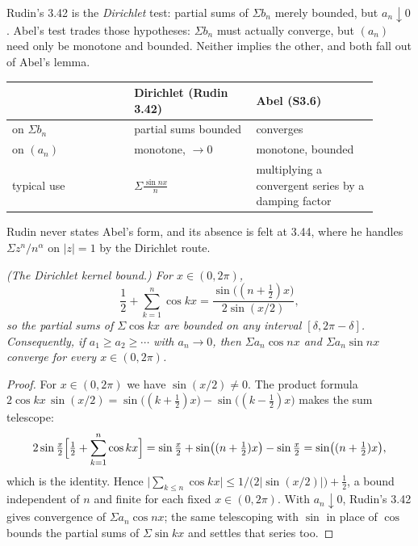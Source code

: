\begin{deeper}
Rudin's 3.42 is the \emph{Dirichlet} test: partial sums of $\Sigma b_n$
merely bounded, but $a_n \downarrow 0$. Abel's test trades those hypotheses:
$\Sigma b_n$ must actually converge, but $(a_n)$ need only be monotone and
bounded. Neither implies the other, and both fall out of Abel's lemma.

\smallskip
\begin{tabular}{@{}p{0.3\linewidth}p{0.3\linewidth}p{0.3\linewidth}@{}}
\toprule
& \textbf{Dirichlet (Rudin 3.42)} & \textbf{Abel (S3.6)} \\
\midrule
on $\Sigma b_n$   & partial sums bounded & converges \\
on $(a_n)$        & monotone, $\to 0$    & monotone, bounded \\
typical use       & $\Sigma \frac{\sin nx}{n}$ & multiplying a convergent
series by a damping factor \\
\bottomrule
\end{tabular}

\smallskip
Rudin never states Abel's form, and its absence is felt at 3.44, where he
handles $\Sigma z^n/n^{\alpha}$ on $|z|=1$ by the Dirichlet route.
\end{deeper}

\emph{(The Dirichlet kernel bound.) For $x \in (0,2\pi)$,}
\[ \frac12 + \sum_{k=1}^{n}\cos kx
   = \frac{\sin\bigl((n+\tfrac12)x\bigr)}{2\sin(x/2)} , \]
\emph{so the partial sums of $\Sigma\cos kx$ are bounded on any interval
$[\delta, 2\pi-\delta]$. Consequently, if $a_1 \ge a_2 \ge \cdots$ with
$a_n \to 0$, then $\Sigma a_n \cos nx$ and $\Sigma a_n \sin nx$ converge for
every $x \in (0,2\pi)$.}
\begin{proof}
For $x \in (0,2\pi)$ we have $\sin(x/2) \ne 0$. The product formula
$2\cos kx\,\sin(x/2) = \sin\bigl((k+\tfrac12)x\bigr) -
\sin\bigl((k-\tfrac12)x\bigr)$ makes the sum telescope:
\[ 2\sin\tfrac{x}{2}\Bigl[\tfrac12 + \sum_{k=1}^{n}\cos kx\Bigr]
   = \sin\tfrac{x}{2} + \sin\bigl((n+\tfrac12)x\bigr) - \sin\tfrac{x}{2}
   = \sin\bigl((n+\tfrac12)x\bigr), \]
which is the identity. Hence
$\bigl|\sum_{k\le n}\cos kx\bigr| \le 1/\bigl(2|\sin(x/2)|\bigr) + \tfrac12$,
a bound independent of $n$ and finite for each fixed
$x \in (0,2\pi)$. With $a_n \downarrow 0$, Rudin's 3.42 gives convergence of
$\Sigma a_n\cos nx$; the same telescoping with $\sin$ in place of $\cos$
bounds the partial sums of $\Sigma \sin kx$ and settles that series too.
\end{proof}

